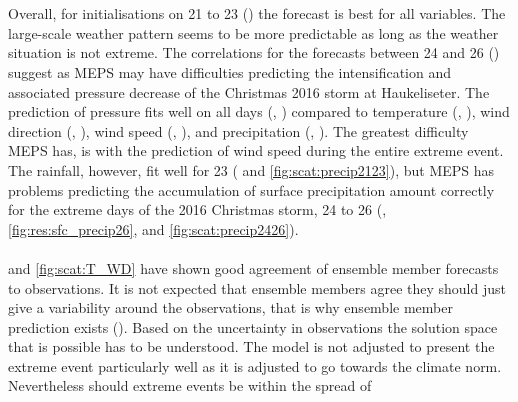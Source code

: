 \noindent
\\
\\
Overall, for initialisations on \num{21} to \SI{23}{\dec} () the forecast is best for all variables. 
The large-scale weather pattern seems to be more predictable as long as the weather situation is not extreme.
The correlations for the forecasts between \num{24} and \SI{26}{\dec} () suggest as MEPS may have difficulties predicting the intensification and associated pressure decrease of the Christmas 2016 storm at Haukeliseter. The prediction of pressure fits well on all days (, ) compared to temperature (, ), wind direction (, ), wind speed (, ), and precipitation (, ). The greatest difficulty MEPS has, is with the prediction of wind speed during the entire extreme event. The rainfall, however, fit well for \SI{23}{\dec} ( and \ref{fig:scat:precip2123}), but MEPS has problems predicting the accumulation of surface precipitation amount correctly for the extreme days of the 2016 Christmas storm, \num{24} to \SI{26}{\dec} (, \ref{fig:res:sfc_precip26}, and \ref{fig:scat:precip2426}).
\\
\\
 and \ref{fig:scat:T_WD} have shown good agreement of ensemble member forecasts to observations. It is not expected that ensemble members agree they should just give a variability around the observations, that is why ensemble member prediction exists (). Based on the uncertainty in observations the solution space that is possible has to be understood. The model is not adjusted to present the extreme event particularly well as it is adjusted to go towards the climate norm.
Nevertheless should extreme events be within the spread of





